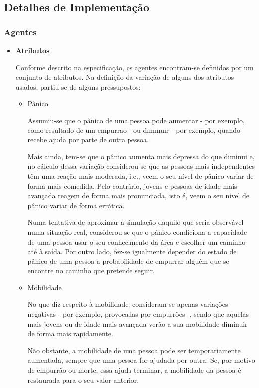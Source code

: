 \documentclass[12pt]{article}
\begin{document}
\begin{titlepage}
\newpage
\subsection{Detalhes de Implementação}
\subsubsection{Agentes}

\begin{itemize}
	
\item \textbf{Atributos}

Conforme descrito na especificação, os agentes encontram-se definidos por um conjunto de atributos.
Na definição da variação de alguns dos atributos usados, partiu-se de alguns pressupostos:

\begin{itemize}
\item Pânico

Assumiu-se que o pânico de uma pessoa pode aumentar - por exemplo, como resultado de um empurrão - ou diminuir - por exemplo, quando recebe ajuda por parte de outra pessoa. 

Mais ainda, tem-se que o pânico aumenta mais depressa do que diminui e, no cálculo dessa variação considerou-se que as pessoas mais independentes têm uma reação mais moderada, i.e., veem o seu nível de pânico variar de forma mais comedida. Pelo contrário, jovens e pessoas de idade mais avançada reagem de forma mais pronunciada, isto é, veem o seu nível de pânico variar de forma errática.

Numa tentativa de aproximar a simulação daquilo que seria observável numa situação real, considerou-se que o pânico condiciona a capacidade de uma pessoa usar o seu conhecimento da área e escolher um caminho até à saída. Por outro lado, fez-se igualmente depender do estado de pânico de uma pessoa a probabilidade de empurrar alguém que se encontre no caminho que pretende seguir.\newline


\item Mobilidade

No que diz respeito à mobilidade, consideram-se apenas variações negativas - por exemplo, provocadas por empurrões -, sendo que aquelas mais jovens ou de idade mais avançada verão a sua mobilidade diminuir de forma mais rapidamente.

Não obstante, a mobilidade de uma pessoa pode ser temporariamente aumentada, sempre que uma pessoa for ajudada por outra. Se, por motivo de empurrão ou morte, essa ajuda terminar, a mobilidade da pessoa é restaurada para o seu valor anterior.


\end{itemize}
\end{itemize}
\end{titlepage}
\end{document}
